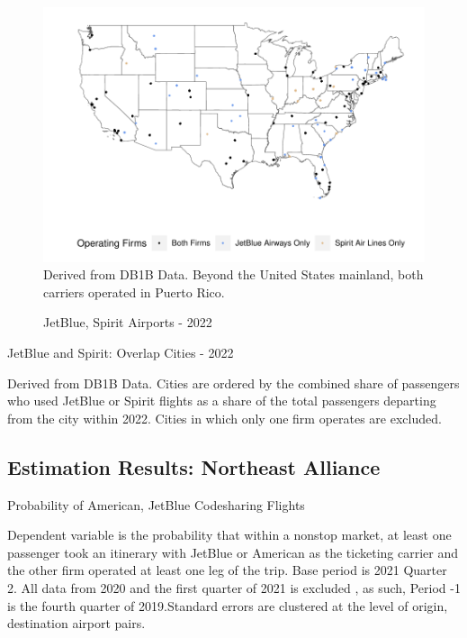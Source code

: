 \documentclass{article}
\begin{document}
\begin{appendices}
\begin{figure}
	\caption{JetBlue, Spirit Airports - 2022}
	\label{fig:JBSpirit_Airports_2022}
	\includegraphics[width = \linewidth]{Map_Mainland_Both_2022.pdf}
	\footnotesize{Derived from DB1B Data. Beyond the United States mainland, both carriers operated in Puerto Rico.}
\end{figure}


	\begin{table}
		\caption{JetBlue and Spirit: Overlap Cities - 2022}
		\label{tab:KeyCities}
		
		\footnotesize{Derived from DB1B Data. Cities are ordered by the combined share of passengers who used JetBlue or Spirit flights as a share of the total passengers departing from the city within 2022. Cities in which only one firm operates are excluded.}
	\end{table}

	
	\FloatBarrier
	
	\subsection{Estimation Results: Northeast Alliance}

	\begin{table}[h]
	\caption{Probability of American, JetBlue Codesharing Flights}
	\label{tab:NEA_Switch_Prob}
     \vspace{-10mm}
    \begin{center}
	
    \end{center}
         \vspace{-8mm}
	\footnotesize{Dependent variable is the probability that within a nonstop market, at least one passenger took an itinerary with JetBlue or American as the ticketing carrier and the other firm operated at least one leg of the trip. Base period is 2021 Quarter 2. All data from 2020 and the first quarter of 2021 is excluded , as such,  Period -1 is the fourth quarter of 2019.Standard errors are clustered at the level of origin, destination airport pairs.}
\end{table}


\end{appendices}
\end{document}
